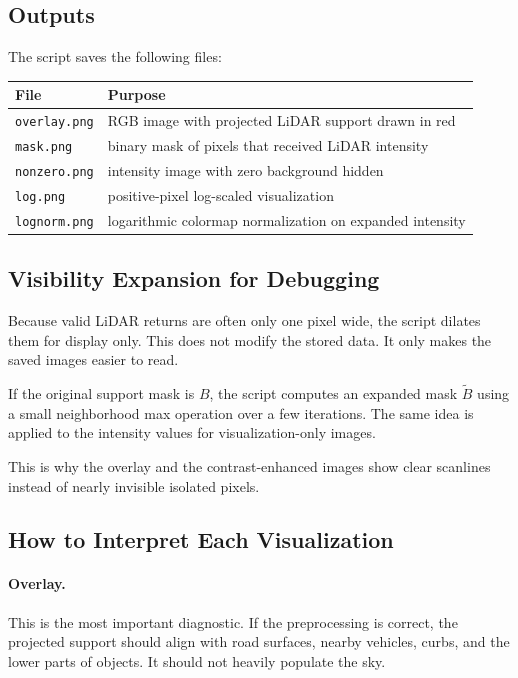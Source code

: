 \documentclass[11pt]{article}
\begin{document}
\subsection{Outputs}
The script saves the following files:

\begin{center}
\begin{tabular}{ll}
\toprule
File & Purpose \\
\midrule
\texttt{overlay.png} & RGB image with projected LiDAR support drawn in red \\
\texttt{mask.png} & binary mask of pixels that received LiDAR intensity \\
\texttt{nonzero.png} & intensity image with zero background hidden \\
\texttt{log.png} & positive-pixel log-scaled visualization \\
\texttt{lognorm.png} & logarithmic colormap normalization on expanded intensity \\
\bottomrule
\end{tabular}
\end{center}

\subsection{Visibility Expansion for Debugging}
Because valid LiDAR returns are often only one pixel wide, the script dilates them for display only. This does not modify the stored data. It only makes the saved images easier to read.

If the original support mask is $B$, the script computes an expanded mask $\tilde{B}$ using a small neighborhood max operation over a few iterations. The same idea is applied to the intensity values for visualization-only images.

This is why the overlay and the contrast-enhanced images show clear scanlines instead of nearly invisible isolated pixels.

\subsection{How to Interpret Each Visualization}
\paragraph{Overlay.}
This is the most important diagnostic. If the preprocessing is correct, the projected support should align with road surfaces, nearby vehicles, curbs, and the lower parts of objects. It should not heavily populate the sky.
\end{document}
